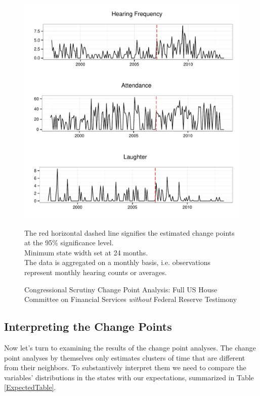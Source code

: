 \documentclass[a4paper]{article}\usepackage[]{graphicx}\usepackage[]{color}
\newenvironment{knitrout}{}{} %
\begin{document}
\begin{figure}
    \caption{Congressional Scrutiny Change Point Analysis: Full US House Committee on Financial Services \emph{without} Federal Reserve Testimony}
    \label{fig:BaseNonFedCP}
\begin{knitrout}
\color{fgcolor}

{\centering \includegraphics[width=0.8\linewidth]{figure/ScrutinyNonFedCP} 

}



\end{knitrout}
{\scriptsize{The red horizontal dashed line signifies the estimated change points at the 95\% significance level.\\
Minimum state width set at 24 months. \\
The data is aggregated on a monthly basis, i.e. observations represent monthly hearing counts or averages.}}
\end{figure}

\subsection{Interpreting the Change Points}

Now let's turn to examining the results of the change point analyses. The change point analyses by themselves only estimates clusters of time that are different from their neighbors. To substantively interpret them we need to compare the variables' distributions in the states with our expectations, summarized in Table \ref{ExpectedTable}.
\end{document}
